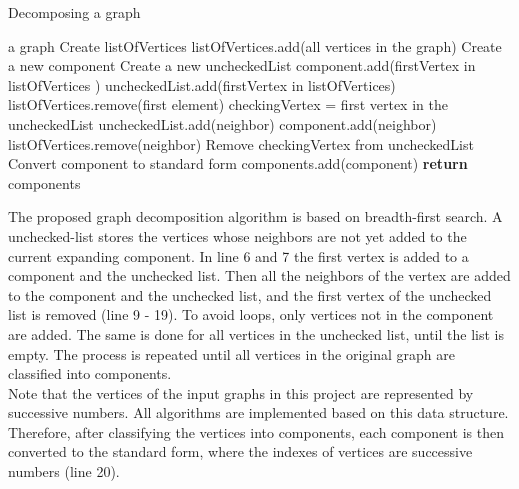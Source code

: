 \documentclass[a4paper]{report}
\begin{document}
		\begin{algorithm}
			\caption{Decomposing a graph}
			\label{alg:decompose}
			\begin{algorithmic}[1]
				\REQUIRE a graph
				\STATE Create listOfVertices 
				\STATE listOfVertices.add(all vertices in the graph)
				\STATE Create a new component
				\STATE Create a new uncheckedList
				\STATE component.add(firstVertex in listOfVertices )
				\STATE uncheckedList.add(firstVertex in listOfVertices)
				\STATE listOfVertices.remove(first element)
				\STATE checkingVertex = first vertex in the uncheckedList
				\STATE uncheckedList.add(neighbor)
				\STATE component.add(neighbor)
				\ENDIF
				\STATE listOfVertices.remove(neighbor)
				\ENDFOR
				\STATE Remove checkingVertex from uncheckedList
				\ENDWHILE
				\STATE Convert component to standard form
				\STATE components.add(component)
				\ENDWHILE
				\STATE \textbf{return} components
				
			\end{algorithmic}
		\end{algorithm}
		The proposed graph decomposition algorithm is based on breadth-first search. A unchecked-list stores the vertices whose neighbors are not yet added to the current expanding component. In line 6 and 7 the first vertex is added to a component and the unchecked list. Then all the neighbors of the vertex are added to the component and the unchecked list, and the first vertex of the unchecked list is removed (line 9 - 19). To avoid loops, only vertices not in the component are added. The same is done for all vertices in the unchecked list, until the list is empty. The process is repeated until all vertices in the original graph are classified into components.\\
		
		Note that the vertices of the input graphs in this project are represented by successive numbers. All algorithms are implemented based on this data structure. Therefore, after classifying the vertices into components, each component is then converted to the standard form, where the indexes of vertices are successive numbers (line 20).
		
\end{document}
